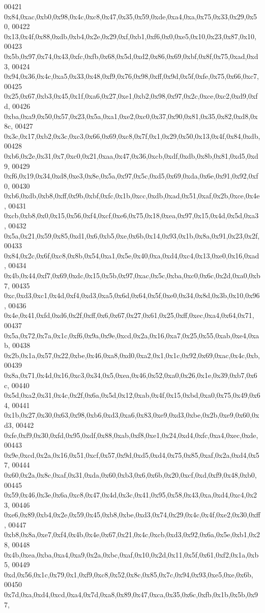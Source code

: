 \begin{DoxyCode}
00421   0x84,0xac,0xb0,0x98,0x4c,0xc8,0x47,0x35,0x59,0xde,0xa4,0xa,0x75,0x33,0x29,0x50,
00422   0x13,0x4f,0x88,0xdb,0xb4,0x2e,0x29,0xf,0xb1,0xf6,0x0,0xe5,0x10,0x23,0x87,0x10,
00423   0x5b,0x97,0x74,0x43,0xfc,0xfb,0x68,0x5d,0xd2,0x86,0x69,0xbf,0x8f,0x75,0xad,0xd3,
00424   0x94,0x36,0x4c,0xa5,0x33,0x48,0xf9,0x76,0x98,0xff,0x9d,0x5f,0xfe,0x75,0x66,0xc7,
00425   0x25,0x67,0xb3,0x45,0x1f,0xa6,0x27,0xe1,0xb2,0x98,0x97,0x2c,0xce,0xc2,0xd9,0xfd,
00426   0xba,0xa9,0x50,0x57,0x23,0x5a,0xa1,0xe2,0xc0,0x37,0x90,0x81,0x35,0x82,0xd8,0x8c,
00427   0x3c,0x17,0xb2,0x3c,0xc3,0x66,0x69,0xc8,0x7f,0x1,0x29,0x50,0x13,0x4f,0x84,0xdb,
00428   0xb6,0x2e,0x31,0x7,0xc0,0x21,0xaa,0x47,0x36,0xcb,0xdf,0xdb,0x8b,0x81,0xd5,0xd9,
00429   0xf6,0x19,0x34,0xd8,0xe3,0x8e,0x5a,0x97,0x5c,0xd5,0x69,0xda,0x6e,0x91,0x92,0xf0,
00430   0xb6,0xdb,0xb8,0xff,0x9b,0xbf,0xfc,0x1b,0xcc,0xdb,0xad,0x51,0xaf,0x2b,0xce,0x4e,
00431   0xcb,0xb8,0x0,0x15,0x56,0xf4,0xcf,0xe6,0x75,0x18,0xea,0x97,0x15,0x4d,0x5d,0xa3,
00432   0x5a,0x21,0x59,0x85,0xd1,0x6,0xb5,0xe,0x6b,0x14,0x93,0x1b,0x8a,0x91,0x23,0x2f,
00433   0x84,0x2c,0x6f,0xc8,0x8b,0x54,0xa1,0x5e,0x40,0xa,0xd4,0xc4,0x13,0xe0,0x16,0xad,
00434   0x4b,0x44,0xf7,0x69,0xdc,0x15,0x5b,0x97,0xac,0x5c,0xba,0xc0,0x6c,0x2d,0xa0,0xb7,
00435   0xc,0xd3,0xc1,0x4d,0xf4,0xd3,0xa5,0x6d,0x64,0x5f,0xe0,0x34,0x8d,0x3b,0x10,0x96,
00436   0x4e,0x41,0xfd,0xd6,0x2f,0xff,0x6,0x67,0x27,0x61,0x25,0xff,0xec,0xa4,0x64,0x71,
00437   0x5a,0x72,0x7a,0x1c,0xf6,0x9a,0x9e,0xcd,0x2a,0x16,0xa7,0x25,0x55,0xab,0xe4,0xab,
00438   0x2b,0x1a,0x57,0x22,0xbe,0x46,0xa8,0xd0,0xa2,0x1,0x1c,0x92,0x69,0xac,0x4c,0xb,
00439   0x8a,0x71,0x4d,0x16,0xc3,0x34,0x5,0xea,0x46,0x52,0xa0,0x26,0x1e,0x39,0xb7,0x6c,
00440   0x5d,0xa2,0x31,0x4c,0x2f,0x6a,0x5d,0x12,0xab,0x4f,0x15,0xbd,0xa0,0x75,0x49,0x64,
00441   0x1b,0x27,0x30,0x63,0x98,0xb6,0xd3,0xa6,0x83,0xe9,0xd3,0xbe,0x2b,0xe9,0x60,0xd3,
00442   0xfe,0xf9,0x30,0xfd,0x95,0xdf,0x88,0xab,0xf8,0xe1,0x24,0xd4,0xfc,0xa4,0xec,0xde,
00443   0x9e,0xcd,0x2a,0x16,0x51,0xcf,0x57,0x9d,0xd5,0xd4,0x75,0x85,0xaf,0x2a,0xd4,0x57,
00444   0x60,0x2a,0x8c,0xaf,0x31,0xda,0x60,0xb3,0x6,0x6b,0x20,0xcf,0xd,0xf9,0x48,0xb0,
00445   0x59,0x46,0x3e,0x6a,0xc8,0x47,0x4d,0x3c,0x41,0x95,0x58,0x43,0xa,0xd4,0xc4,0x23,
00446   0xe6,0x89,0xb4,0x2e,0x59,0x45,0xb8,0xbe,0xd3,0x74,0x29,0x4c,0x4f,0xe2,0x30,0xff,
00447   0xb8,0x8a,0xe7,0xf4,0x4b,0x4e,0x67,0x21,0x4c,0xcb,0xd3,0x92,0x6a,0x5e,0xb1,0x28,
00448   0x4b,0xea,0xba,0xa4,0xa9,0x2a,0xbc,0xaf,0x10,0x2d,0x11,0x5f,0x61,0xf2,0x1a,0xb5,
00449   0xd,0x56,0x1c,0x79,0x1,0xf9,0xc8,0x52,0x8c,0x85,0x7c,0x94,0x93,0xe5,0xe,0x6b,
00450   0x7d,0xa,0xd4,0xcd,0xa4,0x7d,0xa8,0x89,0x47,0xca,0x35,0x6c,0xfb,0x1b,0x5b,0x97,

\end{DoxyCode}

